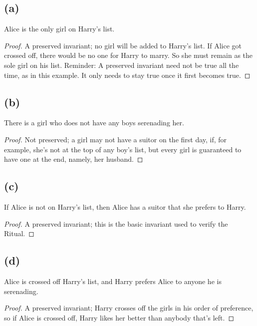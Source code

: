 \documentclass[14pt]{extarticle}
\begin{document}
\subsection{(a)}
Alice is the only girl on Harry’s list.
\begin{proof}
A preserved invariant; no girl will be added to Harry’s list. If Alice got crossed off, there would be no one for Harry to marry. So she must remain as the sole girl on his list. Re­minder: A preserved invariant need not be true all the time, as in this example. It only needs to stay true once it first becomes true.
\end{proof}

\subsection{(b)}
There is a girl who does not have any boys serenading her.
\begin{proof}
Not preserved; a girl may not have a suitor on the first day, if, for example, she’s not at the top of any boy’s list, but every girl is guaranteed to have one at the end, namely, her husband.
\end{proof}

\subsection{(c)}
If Alice is not on Harry’s list, then Alice has a suitor that she prefers to Harry.
\begin{proof}
A preserved invariant; this is the basic invariant used to verify the Ritual.
\end{proof}

\subsection{(d)}
Alice is crossed off Harry’s list, and Harry prefers Alice to anyone he is serenading.
\begin{proof}
A preserved invariant; Harry crosses off the girls in his order of preference, so if Alice is crossed off, Harry likes her better than anybody that’s left.
\end{proof}
\end{document}
